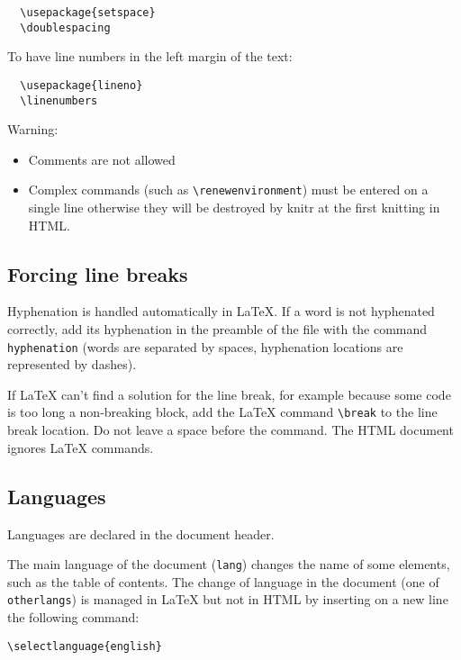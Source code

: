 \documentclass[fleqn,]{article} %
\providecommand{\tightlist}{%
  \setlength{\itemsep}{0pt}\setlength{\parskip}{0pt}}
\begin{document}
\begin{verbatim}
  \usepackage{setspace}
  \doublespacing
\end{verbatim}

To have line numbers in the left margin of the text:

\begin{verbatim}
  \usepackage{lineno}
  \linenumbers
\end{verbatim}

Warning:

\begin{itemize}
\tightlist
\item
  Comments are not allowed
\item
  Complex commands (such as \texttt{\textbackslash{}renewenvironment}) must be entered on a single line otherwise they will be destroyed by knitr at the first knitting in HTML.
\end{itemize}

\hypertarget{forcing-line-breaks}{%
\subsection{Forcing line breaks}\label{forcing-line-breaks}}

Hyphenation is handled automatically in LaTeX.
If a word is not hyphenated correctly, add its hyphenation in the preamble of the file with the command \texttt{hyphenation} (words are separated by spaces, hyphenation locations are represented by dashes).

If LaTeX can't find a solution for the line break, for example because some code is too long a non-breaking block, add the LaTeX command \texttt{\textbackslash{}break} to the line break location.
Do not leave a space before the command.
The HTML document ignores LaTeX commands.

\hypertarget{languages}{%
\subsection{Languages}\label{languages}}

Languages are declared in the document header.

The main language of the document (\texttt{lang}) changes the name of some elements, such as the table of contents.
The change of language in the document (one of \texttt{otherlangs}) is managed in LaTeX but not in HTML by inserting on a new line the following command:

\begin{verbatim}
\selectlanguage{english}
\end{verbatim}
\end{document}
